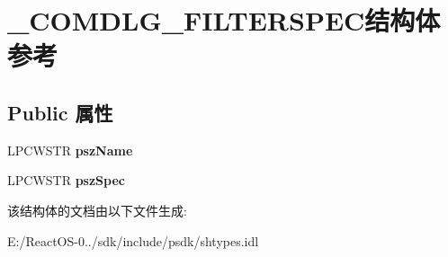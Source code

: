 \hypertarget{struct___c_o_m_d_l_g___f_i_l_t_e_r_s_p_e_c}{}\section{\+\_\+\+C\+O\+M\+D\+L\+G\+\_\+\+F\+I\+L\+T\+E\+R\+S\+P\+E\+C结构体 参考}
\label{struct___c_o_m_d_l_g___f_i_l_t_e_r_s_p_e_c}
\subsection*{Public 属性}
\begin{DoxyCompactItemize}
\item 
\mbox{\label{struct___c_o_m_d_l_g___f_i_l_t_e_r_s_p_e_c_a0cc64acfe1eb06651a386871c78d2a24}} 
L\+P\+C\+W\+S\+TR {\bfseries psz\+Name}
\item 
\mbox{\label{struct___c_o_m_d_l_g___f_i_l_t_e_r_s_p_e_c_a734081de2ba5e0f4ef60cdbd84ff6629}} 
L\+P\+C\+W\+S\+TR {\bfseries psz\+Spec}
\end{DoxyCompactItemize}


该结构体的文档由以下文件生成\+:\begin{DoxyCompactItemize}
\item 
E\+:/\+React\+O\+S-\/0../sdk/include/psdk/shtypes.\+idl\end{DoxyCompactItemize}
